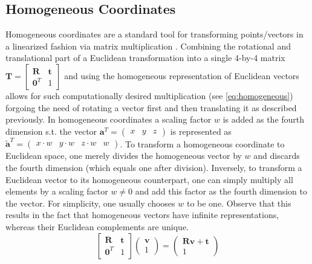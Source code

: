 \documentclass[headsepline, hidelinks, footsepline, footinclude=false, oneside, fontsize=11pt, paper=a4, listof=totoc, bibliography=totoc]{scrbook}
\begin{document}
\subsection{Homogeneous Coordinates \label{homogeneous-coordinates}}
\label{sec:org312b44c}
    Homogeneous coordinates are a standard tool for transforming points/vectors in a linearized fashion via matrix multiplication \cite{murrayMathematicalIntroductionRobotic1994}. 
Combining the rotational and translational part of a Euclidean transformation into a single 4-by-4 matrix \(\mathbf{T}=\begin{bmatrix} \mathbf{R}  & \mathbf{t} \\ \mathbf{0}^T & 1 \end{bmatrix}\) and 
using the homogeneous representation of Euclidean vectors allows for such computationally desired multiplication (see \cref{eq:homogeneous}) forgoing the need of rotating a vector first and then translating it as described
previously.
In homogeneous coordinates a scaling factor \(w\) is added as the fourth dimension s.t. the vector \(\mathbf{a}^T = \begin{pmatrix}x & y & z\end{pmatrix}\) is represented as \(\mathbf{\tilde{a}}^T = \begin{pmatrix}x\cdot w & y\cdot w & z \cdot w & w\end{pmatrix}\). 
To transform a homogeneous coordinate to Euclidean space, one merely divides the homogeneous vector by \(w\) and discards the fourth dimension (which equals one after division). 
Inversely, to transform a Euclidean vector to its homogeneous counterpart, one can simply multiply all elements by a scaling factor \(w \neq 0\) and add this factor as the fourth dimension to the vector. 
For simplicity, one usually chooses \(w\) to be one. Observe that this results in the fact that homogeneous vectors have infinite representations, whereas their Euclidean complements are unique.
\begin{equation}
\label{eq:homogeneous}
\begin{bmatrix} \mathbf{R}  & \mathbf{t} \\ \mathbf{0}^T & 1 \end{bmatrix}\begin{pmatrix}\mathbf{v} \\ 1 \end{pmatrix}
= \begin{pmatrix}\mathbf{R}\mathbf{v} + \mathbf{t} \\1\end{pmatrix}
\end{equation}
\end{document}

